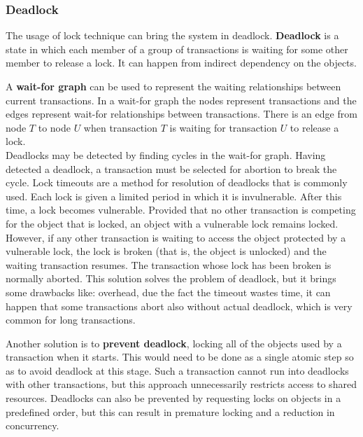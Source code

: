 \subsubsection{Deadlock}

The usage of lock technique can bring the system in deadlock. \textbf{Deadlock} is a state in which each member of a group of transactions is waiting for some other member to release a lock. It can happen from indirect dependency on the objects.

A \textbf{wait-for graph} can be used to represent the waiting relationships between current transactions. In a wait-for graph the nodes represent transactions and the edges represent wait-for relationships between transactions. There is an edge from node $T$ to node $U$ when transaction $T$ is waiting for transaction $U$ to release a lock.\\
Deadlocks may be detected by finding cycles in the wait-for graph. Having detected a deadlock, a transaction must be selected for abortion to break the cycle. 
Lock timeouts are a method for resolution of deadlocks that is commonly used. Each lock is given a limited period in which it is invulnerable. After this time, a lock becomes vulnerable. Provided that no other transaction is competing for the object
that is locked, an object with a vulnerable lock remains locked. However, if any other transaction is waiting to access the object protected by a vulnerable lock, the lock is broken (that is, the object is unlocked) and the waiting transaction resumes. The transaction whose lock has been broken is normally aborted. 
This solution solves the problem of deadlock, but it brings some drawbacks like: overhead, due the fact the timeout wastes time, it can happen that some transactions abort also without actual deadlock, which is very common for long transactions.

Another solution is to \textbf{prevent deadlock}, locking all of the objects used by a transaction when it starts. This would need to be done as a single atomic step so as to avoid deadlock at this stage. Such a transaction cannot run into deadlocks with other transactions, but this approach unnecessarily restricts access to shared resources. Deadlocks can also be prevented by requesting locks on
objects in a predefined order, but this can result in premature locking and a reduction in
concurrency.


